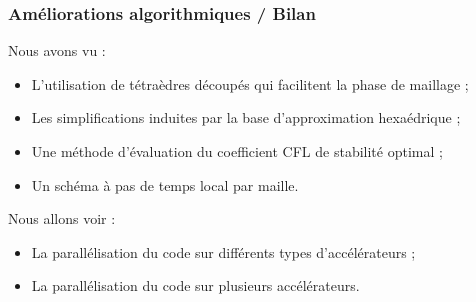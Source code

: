 \begin{frame}
\frametitle{Améliorations algorithmiques / Bilan}
\vfill
Nous avons vu :
\begin{itemize}
\item L'utilisation de tétraèdres découpés qui facilitent la phase de maillage ;
\item Les simplifications induites par la base d'approximation hexaédrique ;
\item Une méthode d'évaluation du coefficient CFL de stabilité optimal ;
\item Un schéma à pas de temps local par maille.
\end{itemize}
\vfill
Nous allons voir :
\begin{itemize}
\item La parallélisation du code sur différents types d'accélérateurs ;
\item La parallélisation du code sur plusieurs accélérateurs.
\end{itemize}
\vfill
\end{frame}


